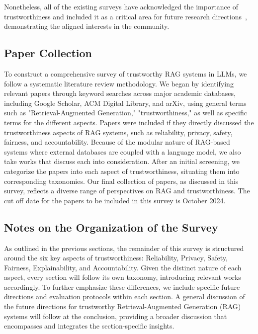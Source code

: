 Nonetheless, all of the existing surveys have acknowledged the importance of trustworthiness and included it as a critical area for future research directions~\cite{Gao2023Retrieval, fan2024survey}, demonstrating the aligned interests in the community. 

\subsection{Paper Collection}
To construct a comprehensive survey of trustworthy RAG systems in LLMs, we follow a systematic
literature review methodology. We began by identifying relevant papers through
keyword searches across major academic databases, including Google Scholar, ACM
Digital Library, and arXiv, using general terms such as "Retrieval-Augmented
Generation," "trustworthiness," as well as specific terms for the different
aspects. Papers were included if they directly discussed the trustworthiness
aspects of RAG systems, such as reliability, privacy, safety, fairness, and accountability.
Because of the modular nature of RAG-based systems where external databases are
coupled with a language model, we also take works that discuss each into
consideration. After an initial screening, we categorize the papers into each
aspect of trustworthiness, situating them into corresponding taxonomies. Our
final collection of papers, as discussed in this survey, reflects a diverse
range of perspectives on RAG and trustworthiness. The cut off date for the papers to be included in this survey is October 2024. 

\subsection{Notes on the Organization of the Survey}
As outlined in the previous sections, the remainder of this survey is structured around the six key aspects of trustworthiness: Reliability, Privacy, Safety, Fairness, Explainability, and Accountability. Given the distinct nature of each aspect, every section will follow its own
taxonomy, introducing relevant works accordingly. To further emphasize these
differences, we include specific future directions and evaluation protocols
within each section. A general discussion of the future directions for
trustworthy Retrieval-Augmented Generation (RAG) systems will follow at the
conclusion, providing a broader discussion that encompasses and integrates the
section-specific insights.